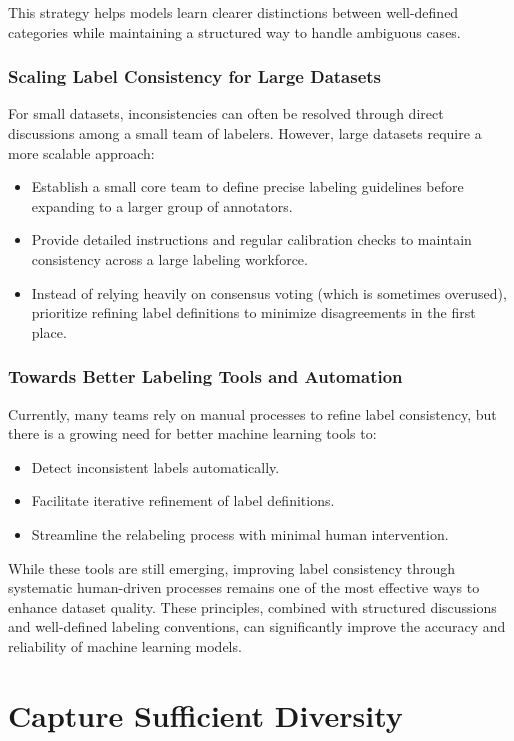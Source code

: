 \documentclass[12pt,openany]{book}
\begin{document}
This strategy helps models learn clearer distinctions between well-defined categories while maintaining a structured way to handle ambiguous cases.

\subsubsection{Scaling Label Consistency for Large Datasets}
For small datasets, inconsistencies can often be resolved through direct discussions among a small team of labelers. However, large datasets require a more scalable approach:
\begin{itemize}
    \item Establish a small core team to define precise labeling guidelines before expanding to a larger group of annotators.
    \item Provide detailed instructions and regular calibration checks to maintain consistency across a large labeling workforce.
    \item Instead of relying heavily on consensus voting (which is sometimes overused), prioritize refining label definitions to minimize disagreements in the first place.
\end{itemize}

\subsubsection{Towards Better Labeling Tools and Automation}
Currently, many teams rely on manual processes to refine label consistency, but there is a growing need for better machine learning tools to:
\begin{itemize}
    \item Detect inconsistent labels automatically.
    \item Facilitate iterative refinement of label definitions.
    \item Streamline the relabeling process with minimal human intervention.
\end{itemize}

While these tools are still emerging, improving label consistency through systematic human-driven processes remains one of the most effective ways to enhance dataset quality. These principles, combined with structured discussions and well-defined labeling conventions, can significantly improve the accuracy and reliability of machine learning models.



\section{Capture Sufficient Diversity}
\end{document}
